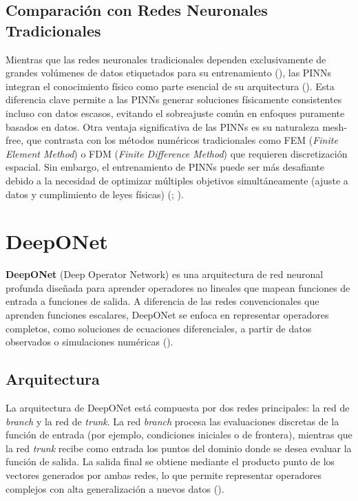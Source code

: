 \documentclass[
  spanish,
  us-letterpaper,
  DIV=11,
  numbers=noendperiod]{scrreprt}
\theoremstyle{plain}
\theoremstyle{definition}
\theoremstyle{remark}
\begin{document}
\section{Comparación con Redes Neuronales
Tradicionales}\label{comparaciuxf3n-con-redes-neuronales-tradicionales}

Mientras que las redes neuronales tradicionales dependen exclusivamente
de grandes volúmenes de datos etiquetados para su entrenamiento
(), las PINNs
integran el conocimiento físico como parte esencial de su arquitectura
(). Esta diferencia
clave permite a las PINNs generar soluciones físicamente consistentes
incluso con datos escasos, evitando el sobreajuste común en enfoques
puramente basados en datos. Otra ventaja significativa de las PINNs es
su naturaleza mesh-free, que contrasta con los métodos numéricos
tradicionales como FEM (\emph{Finite Element Method}) o FDM
(\emph{Finite Difference Method}) que requieren discretización espacial.
Sin embargo, el entrenamiento de PINNs puede ser más desafiante debido a
la necesidad de optimizar múltiples objetivos simultáneamente (ajuste a
datos y cumplimiento de leyes físicas)
(;
).

\chapter{DeepONet}\label{deeponet}

\textbf{DeepONet} (Deep Operator Network) es una arquitectura de red
neuronal profunda diseñada para aprender operadores no lineales que
mapean funciones de entrada a funciones de salida. A diferencia de las
redes convencionales que aprenden funciones escalares, DeepONet se
enfoca en representar operadores completos, como soluciones de
ecuaciones diferenciales, a partir de datos observados o simulaciones
numéricas ().

\section{Arquitectura}\label{arquitectura}

La arquitectura de DeepONet está compuesta por dos redes principales: la
red de \emph{branch} y la red de \emph{trunk}. La red \emph{branch}
procesa las evaluaciones discretas de la función de entrada (por
ejemplo, condiciones iniciales o de frontera), mientras que la red
\emph{trunk} recibe como entrada los puntos del dominio donde se desea
evaluar la función de salida. La salida final se obtiene mediante el
producto punto de los vectores generados por ambas redes, lo que permite
representar operadores complejos con alta generalización a nuevos datos
().
\end{document}

